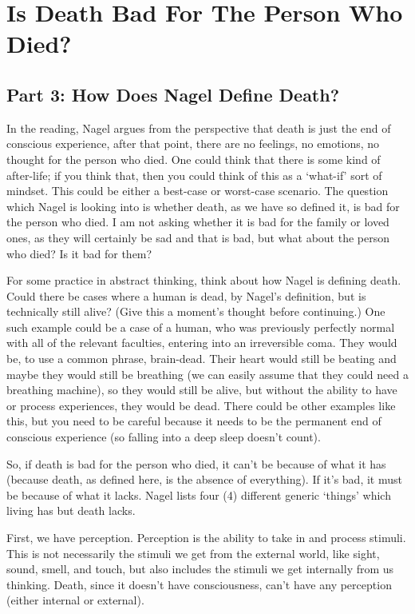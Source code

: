 \part{Is Death Bad For The Person Who Died?}
\label{ch.modtwo}

\chapter{Part 3: How Does Nagel Define Death?}
In the reading, Nagel argues from the perspective that death is just the end of conscious experience, after that point, there are no feelings, no emotions, no thought for the person who died. One could think that there is some kind of after-life; if you think that, then you could think of this as a ‘what-if’ sort of mindset. This could be either a best-case or worst-case scenario. The question which Nagel is looking into is whether death, as we have so defined it, is bad for the person who died. I am not asking whether it is bad for the family or loved ones, as they will certainly be sad and that is bad, but what about the person who died? Is it bad for them?

For some practice in abstract thinking, think about how Nagel is defining death. Could there be cases where a human is dead, by Nagel's definition, but is technically still alive? (Give this a moment's thought before continuing.) One such example could be a case of a human, who was previously perfectly normal with all of the relevant faculties, entering into an irreversible coma. They would be, to use a common phrase, brain-dead. Their heart would still be beating and maybe they would still be breathing (we can easily assume that they could need a breathing machine), so they would still be alive, but without the ability to have or process experiences, they would be dead. There could be other examples like this, but you need to be careful because it needs to be the permanent end of conscious experience (so falling into a deep sleep doesn't count).  

So, if death is bad for the person who died, it can't be because of what it has (because death, as defined here, is the absence of everything). If it's bad, it must be because of what it lacks. Nagel lists four (4) different generic `things' which living has but death lacks. 

First, we have perception. Perception is the ability to take in and process stimuli. This is not necessarily the stimuli we get from the external world, like sight, sound, smell, and touch, but also includes the stimuli we get internally from us thinking. Death, since it doesn't have consciousness, can't have any perception (either internal or external). 

